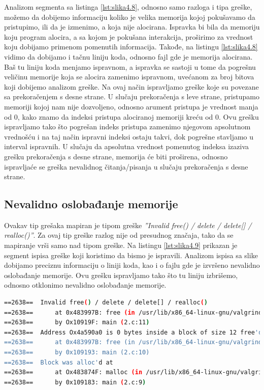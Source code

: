 \documentclass[12pt,oneside]{memoir}
\theoremstyle{plain}
\theoremstyle{definition}
\begin{document}
Analizom segmenta sa listinga \ref{lst:slika4.8}, odnosno samo razloga i tipa greške, možemo da dobijemo informaciju koliko je velika memorija kojoj pokušavamo da pristupimo, ili da je izmenimo, a koja nije alocirana. Ispravka bi bila da memoriju koju program alocira, a sa kojom je pokušana interakcija, proširimo za vrednost koju dobijamo primenom pomenutih informacija. Takođe, na listingu \ref{lst:slika4.8} vidimo da dobijamo i tačnu liniju koda, odnosno fajl gde je memorija alocirana. Baš tu liniju koda menjamo ispravnom, a ispravka se sastoji u tome da pogrešnu veličinu memorije koja se alocira zamenimo ispravnom, uvećanom za broj bitova koji dobijemo analizom greške. Na ovaj način ispravljamo greške koje su povezane sa prekoračenjem s desne strane. U slučaju prekoračenja s leve strane, pristupamo memoriji kojoj nam nije dozvoljeno, odnosno arument pristupa je vrednost manja od 0, kako znamo da indeksi pristupa alociranoj memoriji kreću od 0. Ovu grešku ispravljamo tako što pogrešan indeks pristupa zamenimo njegovom apsolutnom vrednošću i na taj način ispravni indeksi ostaju takvi, dok pogrešne stavljamo u interval ispravnih. U slučaju da apsolutna vrednost pomenutog indeksa izaziva grešku prekoračenja s desne strane, memorija će biti proširena, odnosno ispravljaće se greška nevalidnog čitanja/pisanja u slučaju prekoračenja s desne strane.  


\subsection{Nevalidno oslobađanje memorije}
Ovakav tip grešaka mapiran je tipom greške \textit{''Invalid free() / delete / delete[] / realloc()''}. Za ovaj tip greške razlog nije od presudnog značaja, tako da se mapiranje vrši samo nad tipom greške. Na listingu \ref{lst:slika4.9} prikazan je segment ispisa greške koji koristimo da bismo je ispravili. Analizom ispisa sa slike dobijamo preciznu informaciju o liniji koda, kao i o fajlu gde je izvršeno nevalidno oslobađanje memorije. Ovu grešku ispravljamo tako što tu liniju izbrišemo, odnosno otklonimo nevalidno oslobađanje memorije. 


\begin{lstlisting}[style=terminal,caption={Ispis greške nevalidnog oslobađanja memorije}, label={lst:slika4.9},language={bash}]   
==2638==  Invalid free() / delete / delete[] / realloc()
==2638==      at 0x483997B: free (in /usr/lib/x86_64-linux-gnu/valgrind/vgpreload_memcheck-amd64-linux.so) 
==2638==      by Ox10919F: main (2.c:11)
==2638==  Address Ox4a590a0 is 0 bytes inside a block of size 12 free'd
==2638==      at 0x483997B: free (in /usr/lib/x86_64-linux-gnu/valgrind/vgpreload_memcheck-amd64-linux.so) 
==2638==      by 0x109193: main (2.c:10)
==2638==  Block was alloc'd at
==2638==      at Ox483874F: malloc (in /usr/lib/x86_64-linux-gnu/valgrind/vgpreload_memcheck-amd64-linux.so) 
==2638==      by 0x109183: main (2.c:9)
\end{lstlisting}
\end{document}
